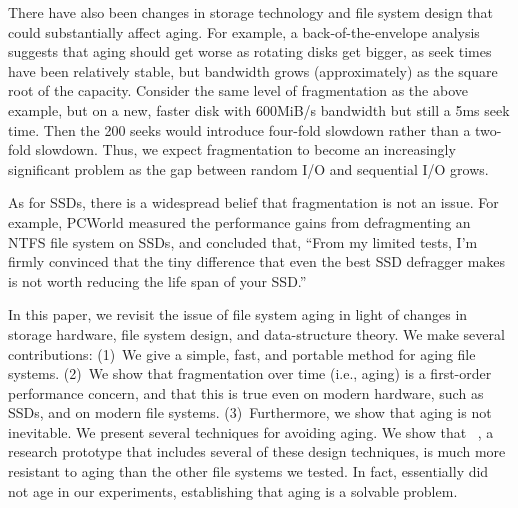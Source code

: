 There have also been changes in storage technology and file system design that
could substantially affect aging.  For example, a back-of-the-envelope analysis
suggests that aging should get worse as rotating disks get bigger, as seek
times have been relatively stable, but bandwidth grows (approximately) as the
square root of the capacity.  Consider the same level of fragmentation as the
above example, but on a new, faster disk with 600MiB/s bandwidth but still
a 5ms seek time.  Then the 200 seeks would introduce four-fold slowdown
rather than a two-fold slowdown.  Thus, we expect fragmentation to become an
increasingly significant problem as the gap between random I/O and sequential
I/O grows. 

As for SSDs, there is a widespread belief that fragmentation is not an issue.
For example, PCWorld measured the performance gains from defragmenting an NTFS
file system on SSDs\cite{pcworld-ssd-defrag-benchmarks}, and concluded that,
``From my limited tests, I'm firmly convinced that the tiny difference that
even the best SSD defragger makes is not worth reducing the life span of your
SSD.'' 

In this paper, we revisit the issue of file system aging in light of changes
in storage hardware, file system design, and data-structure theory.  We make
several contributions:
%
(1)~We give a simple, fast, and portable method for aging file systems.
%
(2)~We show that fragmentation over time (i.e., aging) is a first-order
performance concern, and that this is true even on modern hardware, such as SSDs,
and on modern file systems.
%
(3)~Furthermore, we show that aging is not inevitable.  We present several
techniques for avoiding aging.  We show that
\betrfs~\cite{DBLP:journals/tos/JannenYZAEJMPRW15,DBLP:conf/fast/YuanZJPACDKWBFJ16,DBLP:conf/fast/JannenYZAEJMPRW15,DBLP:conf/hotstorage/EsmetBFK12},
a research prototype that includes several of these design techniques, is much
more resistant to aging than the other file systems we tested.  In fact,
\betrfs essentially did not age in our experiments, establishing that aging is
a solvable problem.


